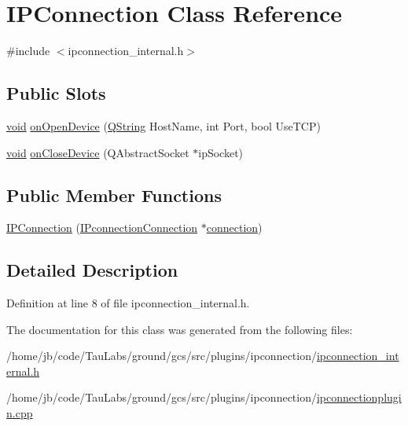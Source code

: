 \hypertarget{class_i_p_connection}{\section{\-I\-P\-Connection \-Class \-Reference}
\label{class_i_p_connection}
}


{\ttfamily \#include $<$ipconnection\-\_\-internal.\-h$>$}

\subsection*{\-Public \-Slots}
\begin{DoxyCompactItemize}
\item 
\hyperlink{group___u_a_v_objects_plugin_ga444cf2ff3f0ecbe028adce838d373f5c}{void} \hyperlink{group___i_p_conn_plugin_ga2620fdde71bd8399a44eeec513197962}{on\-Open\-Device} (\hyperlink{group___u_a_v_objects_plugin_gab9d252f49c333c94a72f97ce3105a32d}{\-Q\-String} \-Host\-Name, int \-Port, bool \-Use\-T\-C\-P)
\item 
\hyperlink{group___u_a_v_objects_plugin_ga444cf2ff3f0ecbe028adce838d373f5c}{void} \hyperlink{group___i_p_conn_plugin_gac260d56bd7a0226cc1c047062b705314}{on\-Close\-Device} (\-Q\-Abstract\-Socket $\ast$ip\-Socket)
\end{DoxyCompactItemize}
\subsection*{\-Public \-Member \-Functions}
\begin{DoxyCompactItemize}
\item 
\hyperlink{group___i_p_conn_plugin_gac181aa5d3b59b0fab84380bea813691c}{\-I\-P\-Connection} (\hyperlink{class_i_pconnection_connection}{\-I\-Pconnection\-Connection} $\ast$\hyperlink{group___i_p_conn_plugin_ga75cb9b33b52928c030806876f2c2f439}{connection})
\end{DoxyCompactItemize}


\subsection{\-Detailed \-Description}


\-Definition at line 8 of file ipconnection\-\_\-internal.\-h.



\-The documentation for this class was generated from the following files\-:\begin{DoxyCompactItemize}
\item 
/home/jb/code/\-Tau\-Labs/ground/gcs/src/plugins/ipconnection/\hyperlink{ipconnection__internal_8h}{ipconnection\-\_\-internal.\-h}\item 
/home/jb/code/\-Tau\-Labs/ground/gcs/src/plugins/ipconnection/\hyperlink{ipconnectionplugin_8cpp}{ipconnectionplugin.\-cpp}\end{DoxyCompactItemize}
